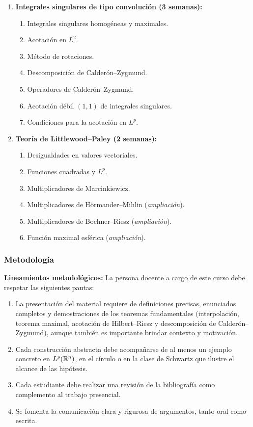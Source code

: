 \begin{refsection}
\begin{enumerate}
\item \textbf{Integrales singulares de tipo convolución (3 semanas):}
\begin{enumerate}
    \item Integrales singulares homogéneas y maximales.
    \item Acotación en $L^2$.
    \item Método de rotaciones.
    \item Descomposición de Calderón--Zygmund.
    \item Operadores de Calderón--Zygmund.
    \item Acotación débil $(1,1)$ de integrales singulares.
    \item Condiciones para la acotación en $L^p$.
\end{enumerate}

\item \textbf{Teoría de Littlewood--Paley (2 semanas):}
\begin{enumerate}
    \item Desigualdades en valores vectoriales.
    \item Funciones cuadradas y $L^p$.
    \item Multiplicadores de Marcinkiewicz.
    \item Multiplicadores de Hörmander--Mihlin (\emph{ampliación}).
    \item Multiplicadores de Bochner--Riesz (\emph{ampliación}).
    \item Función maximal esférica (\emph{ampliación}).
\end{enumerate}

\end{enumerate}

\subsubsection*{Metodología}

\noindent \textbf{Lineamientos metodológicos:} La persona docente a cargo de este curso debe respetar las siguientes pautas:
\begin{enumerate}
    \item La presentación del material requiere de definiciones precisas, enunciados completos y demostraciones de los teoremas fundamentales (interpolación, teorema maximal, acotación de Hilbert--Riesz y descomposición de Calderón--Zygmund), aunque también es importante brindar contexto y motivación.
    \item Cada construcción abstracta debe acompañarse de al menos un ejemplo concreto en $L^p(\mathbb{R}^n)$, en el círculo o en la clase de Schwartz que ilustre el alcance de las hipótesis.
    \item Cada estudiante debe realizar una revisión de la bibliografía como complemento al trabajo presencial.
    \item Se fomenta la comunicación clara y rigurosa de argumentos, tanto oral como escrita.
\end{enumerate}


\end{refsection}
